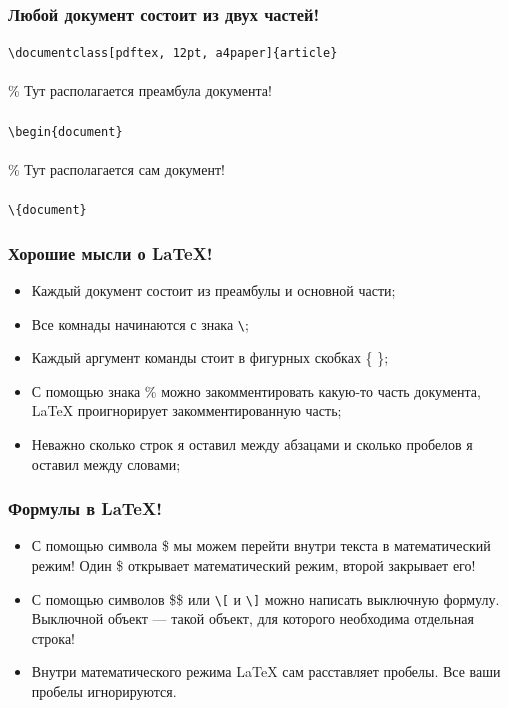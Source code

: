 \documentclass[newPxFont]{beamer}
\begin{document}
\begin{frame}[fragile]
\frametitle{Любой документ состоит из двух частей!} 
\begin{mdframed}[backgroundcolor=LTXLightGreen] 
\verb|\documentclass[pdftex, 12pt, a4paper]{article}|\\
\\
\% Тут располагается преамбула документа!\\
\\
\verb|\begin{document}|\\
\\
\% Тут располагается сам документ!\\
\\
\verb|\{document}|\\
\end{mdframed}    
\end{frame}


\begin{frame}[fragile]
\frametitle{Хорошие мысли о \LaTeX!} 
\begin{itemize}
\item Каждый документ состоит из преамбулы и основной части;
\item Все {\color{green} комнады} начинаются с знака \verb|\|;
\item Каждый аргумент команды стоит в фигурных скобках \{ \};
\item С помощью знака \% можно закомментировать какую-то часть документа, \LaTeX{} проигнорирует закомментированную часть;
\item Неважно сколько строк я оставил между абзацами и сколько пробелов я оставил между словами; 
\end{itemize}
\end{frame}

\begin{frame}[fragile]
\frametitle{Формулы в \LaTeX!} 
\begin{itemize}
\item С помощью символа \$ мы можем перейти внутри текста в математический режим! Один \$ открывает математический режим, второй закрывает его! 
\item С помощью символов \$\$ или \verb|\[| и \verb|\]| можно написать выключную формулу. Выключной объект --- такой объект, для которого необходима отдельная строка!
\item Внутри математического режима \LaTeX{} сам расставляет пробелы. Все ваши пробелы игнорируются.
\end{itemize}
\end{frame}
\end{document}
